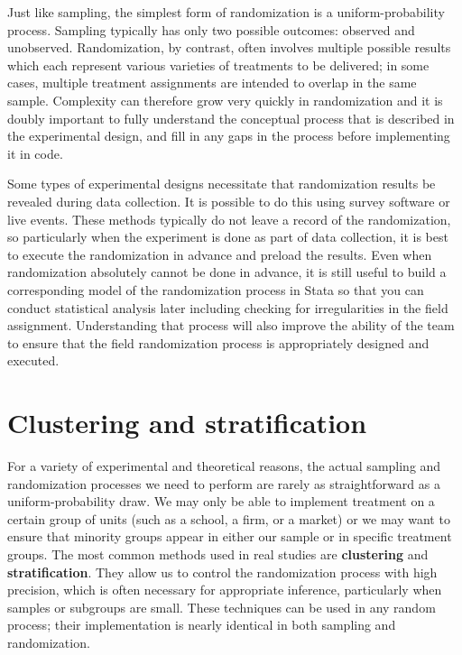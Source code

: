 Just like sampling, the simplest form of randomization is a uniform-probability process.
Sampling typically has only two possible outcomes: observed and unobserved.
Randomization, by contrast, often involves multiple possible results
which each represent various varieties of treatments to be delivered;
in some cases, multiple treatment assignments are intended to overlap in the same sample.
Complexity can therefore grow very quickly in randomization
and it is doubly important to fully understand the conceptual process
that is described in the experimental design,
and fill in any gaps in the process before implementing it in code.

Some types of experimental designs necessitate that randomization results be revealed during data collection.
It is possible to do this using survey software or live events.
These methods typically do not leave a record of the randomization,
so particularly when the experiment is done as part of data collection,
it is best to execute the randomization in advance and preload the results.
Even when randomization absolutely cannot be done in advance, it is still useful
to build a corresponding model of the randomization process in Stata
so that you can conduct statistical analysis later
including checking for irregularities in the field assignment.
Understanding that process will also improve the ability of the team
to ensure that the field randomization process is appropriately designed and executed.



\section{Clustering and stratification}

For a variety of experimental and theoretical reasons,
the actual sampling and randomization processes we need to perform
are rarely as straightforward as a uniform-probability draw.
We may only be able to implement treatment on a certain group of units
(such as a school, a firm, or a market)
or we may want to ensure that minority groups appear
in either our sample or in specific treatment groups.
The most common methods used in real studies are \textbf{clustering} and \textbf{stratification}.
They allow us to control the randomization process with high precision,
which is often necessary for appropriate inference,
particularly when samples or subgroups are small.\cite{athey2017econometrics}
These techniques can be used in any random process;
their implementation is nearly identical in both sampling and randomization.

